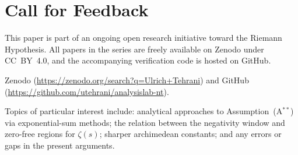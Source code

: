\documentclass[11pt]{article}
\begin{document}
\section*{Call for Feedback}

This paper is part of an ongoing open research initiative toward the
Riemann Hypothesis.
All papers in the series are freely available on Zenodo under CC~BY~4.0, and
the accompanying verification code is hosted on GitHub.

{\sloppy
Zenodo (\url{https://zenodo.org/search?q=Ulrich+Tehrani}) and GitHub
(\url{https://github.com/utehrani/analysislab-nt}).
\par}

Topics of particular interest include:
analytical approaches to Assumption~(A$^{**}$) via exponential-sum methods;
the relation between the negativity window and zero-free regions for
$\zeta(s)$; sharper archimedean constants; and any errors or gaps in the
present arguments.
\end{document}
